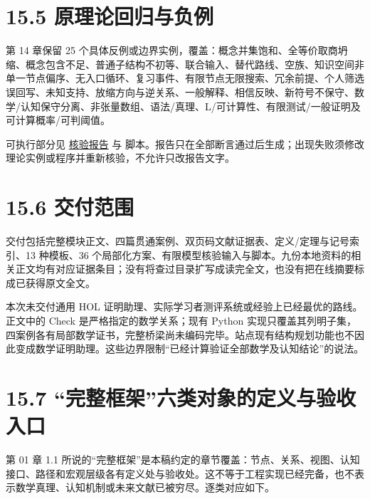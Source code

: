 \documentclass[UTF8,a4paper,zihao=-4,fontset=windows,openany]{ctexbook}
\begin{document}
\section{15.5 原理论回归与负例}
第 14 章保留 25 个具体反例或边界实例，覆盖：概念并集饱和、全等价取商坍缩、概念包含不足、普通子结构不初等、联合输入、替代路线、空族、知识空间非单一节点偏序、无入口循环、复习事件、有限节点无限搜索、冗余前提、个人筛选误回写、未知支持、放缩方向与逆关系、一般解释、相信反映、新符号不保守、数学/认知保守分离、非张量数组、语法/真理、L/可计算性、有限测试/一般证明及可计算概率/可判阈值。

可执行部分见 \hyperref[mcs-source-27]{核验报告} 与 脚本。报告只在全部断言通过后生成；出现失败须修改理论实例或程序并重新核验，不允许只改报告文字。

\section{15.6 交付范围}
交付包括完整模块正文、四篇贯通案例、双页码文献证据表、定义/定理与记号索引、13 种模板、36 个局部化方案、有限模型核验输入与脚本。九份本地资料的相关正文均有对应证据条目；没有将查过目录扩写成读完全文，也没有把在线摘要标成已获得原文全文。

本次未交付通用 HOL 证明助理、实际学习者测评系统或经验上已经最优的路线。正文中的 Check 是严格指定的数学关系；现有 Python 实现只覆盖其列明子集，四案例各有局部数学证书，完整桥梁尚未编码完毕。站点现有结构规划功能也不因此变成数学证明助理。这些边界限制“已经计算验证全部数学及认知结论”的说法。

\section{15.7 “完整框架”六类对象的定义与验收入口}
第 01 章 1.1 所说的“完整框架”是本稿约定的章节覆盖：节点、关系、视图、认知接口、路径和宏观层级各有定义处与验收处。这不等于工程实现已经完备，也不表示数学真理、认知机制或未来文献已被穷尽。逐类对应如下。
\end{document}
